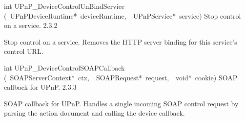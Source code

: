\documentclass{article}
\begin{document}
\begin{cxxentry}
\begin{cxxentry}
\begin{cxxfunction}
\begin{cxxdoc}
\end{cxxdoc}
\end{cxxfunction}
\begin{cxxfunction}
{int}
        {UPnP\_DeviceControlUnBindService}
        {(\ UPnPDeviceRuntime*\ deviceRuntime,\ \ UPnPService*\ service)}
        {Stop control on a service.}
        {2.3.2}
\begin{cxxdoc}
Stop control on a service. Removes the HTTP server binding for this
service's control URL.


\end{cxxdoc}
\end{cxxfunction}
\begin{cxxfunction}
{int}
        {UPnP\_DeviceControlSOAPCallback}
        {(\ SOAPServerContext*\ ctx,\ \ SOAPRequest*\ request,\ \ void*\ cookie)}
        {SOAP callback for UPnP.}
        {2.3.3}
\begin{cxxdoc}
SOAP callback for UPnP.  Handles a single incoming SOAP control request by
parsing the action document and calling the device callback.



\end{cxxdoc}
\end{cxxfunction}
\end{cxxentry}
\end{cxxentry}
\end{document}
